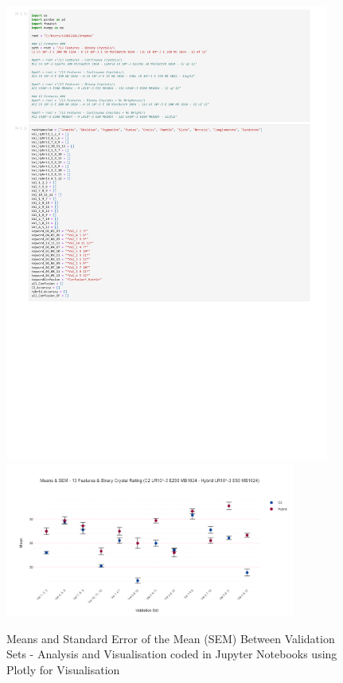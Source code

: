 \begin{figure}[H]
  \centering
    \includegraphics[page=7, width=0.95\textwidth, trim= 20 450 20 10, clip]{Code/Mean_and_SEM_-_Visualisation_of_12_of_12_Validation_Sets.pdf}
    \includegraphics[width=0.85\textwidth, trim = 0.5cm 0cm 0.5cm 3.5cm, clip]{images/Means & SEM - 13 Features & Binary Crystal Rating (C2 LR10^-3 E200 MB1024 - Hybrid LR10^-3 E50 MB1024).png}
    \caption{Means and Standard Error of the Mean (SEM) Between Validation Sets - Analysis and Visualisation coded in Jupyter Notebooks using Plotly for Visualisation} \label{fig:Means and Standard Error of the Mean (SEM) Between Validation Sets - Analysis and Visualisation coded in Jupyter Notebooks using Plotly for Visualisation}
\end{figure}

